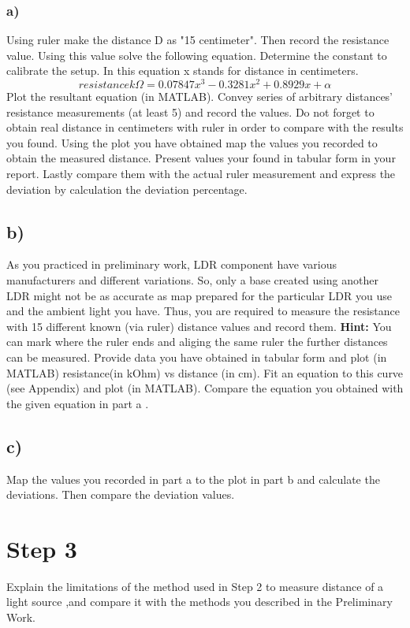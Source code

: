 \documentclass[letterpaper,12pt]{article}
\begin{document}
\subsubsection*{a)}
Using ruler make the distance D as "15 centimeter". Then record the resistance value. Using this value solve the following equation. Determine the  constant to calibrate the setup. In this equation x stands for distance in centimeters.
\[resistance   k\Omega = 0.07847 x^3 -0.3281 x^2 + 0.8929x + \alpha\] 
Plot the resultant equation (in MATLAB). Convey series of arbitrary distances' resistance measurements (at least 5) and record the values. Do not forget to obtain real distance in centimeters with  ruler in order to compare with the results you found. Using the plot you have obtained map the values you recorded to obtain the measured distance. Present  values your found in tabular form in your report. Lastly compare them with the actual ruler measurement and express the deviation by calculation the deviation percentage.\\
\subsection*{b)}
As you practiced in preliminary work, LDR component have various manufacturers and different variations. So, only a base created using another LDR might not be as accurate as map prepared for the particular LDR you use and the ambient light you have. Thus, you are required to measure the resistance with 15 different known (via ruler) distance values and record them. \textbf{Hint:} You can mark where the ruler ends and aliging the same ruler the further distances can be measured. Provide data you have obtained in tabular form and plot (in MATLAB) resistance(in kOhm) vs distance (in cm). Fit an equation to this curve (see Appendix) and plot (in MATLAB). Compare the equation you obtained with the given equation in part a . 
\subsection*{c)}
Map the values you recorded in part a to the plot in part b and calculate the deviations. Then compare the deviation values.
\section*{Step 3} 
Explain the limitations of the method used in Step 2 to measure distance of a light source ,and compare it with the methods you described in the Preliminary Work.
\end{document}
